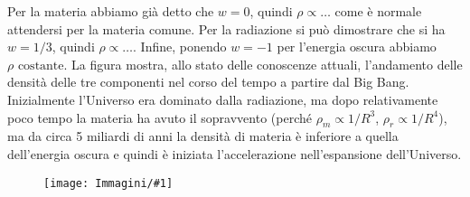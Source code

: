 \documentclass[10pt,a4paper,fleqn,draft]{article}
\newcommand{\figura}[1]{
  \begin{figure}[h!]
    \texttt{[image: Immagini/\#1]}
  \end{figure}
}
\begin{document}
Per la materia abbiamo già detto che $w = 0$, quindi $\rho \propto \dots$ come è
normale attendersi per la materia comune. Per la radiazione si può dimostrare
che si ha $w = 1/3$, quindi $\rho \propto \dots$. Infine, ponendo $w=-1$ per
l'energia oscura abbiamo $\rho \text{ costante}$. La figura mostra, allo stato
delle conoscenze attuali, l'andamento delle densità delle tre componenti nel
corso del tempo a partire dal Big Bang. Inizialmente l'Universo era dominato
dalla radiazione, ma dopo relativamente poco tempo la materia ha avuto il
sopravvento (perché $\rho_m \propto 1/R^3$, $\rho_r \propto 1/R^4$), ma da circa
5 miliardi di anni la densità di materia è inferiore a quella dell'energia
oscura e quindi è iniziata l'accelerazione nell'espansione dell'Universo.
\figura{evoluzione_densita}
\end{document}
